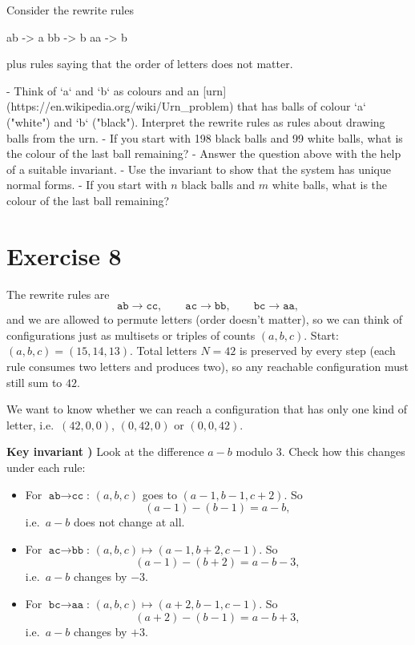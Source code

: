 \documentclass{article}
\theoremstyle{plain}
\theoremstyle{definition}
\theoremstyle{remark}
\begin{document}
Consider the rewrite rules

        ab -> a
        bb -> b
        aa -> b
        
plus rules saying that the order of letters does not matter. 

- Think of `a` and `b` as colours and an [urn](https://en.wikipedia.org/wiki/Urn_problem) that has balls of colour `a` ("white") and `b` ("black"). Interpret the rewrite rules as rules about drawing balls from the urn.
- If you start with 198 black balls and 99 white balls, what is the colour of the last ball remaining? 
- Answer the question above with the help of a suitable invariant.
- Use the invariant to show that the system has unique normal forms.
- If you start with $n$ black balls and $m$ white balls, what is the colour of the last ball remaining?

\section{Exercise 8}

The rewrite rules are
\[
\texttt{ab}\to\texttt{cc},\qquad
\texttt{ac}\to\texttt{bb},\qquad
\texttt{bc}\to\texttt{aa},
\]
and we are allowed to permute letters (order doesn't matter), so we can think of configurations just as multisets or triples of counts \((a,b,c)\).  
Start: \((a,b,c)=(15,14,13)\). Total letters \(N=42\) is preserved by every step (each rule consumes two letters and produces two), so any reachable configuration must still sum to \(42\).

We want to know whether we can reach a configuration that has only one kind of letter, i.e.\ \((42,0,0)\), \((0,42,0)\) or \((0,0,42)\).

\bigskip

\textbf{Key invariant )}  
Look at the difference \(a-b\) modulo \(3\). Check how this changes under each rule:

\begin{itemize}
  \item For \(\texttt{ab}\to\texttt{cc}\): \((a,b,c)\) goes to \((a-1,b-1,c+2)\). So
  \[
  (a-1)-(b-1)=a-b,
  \]
  i.e.\ \(a-b\) does not change at all.
  \item For \(\texttt{ac}\to\texttt{bb}\): \((a,b,c)\mapsto(a-1,b+2,c-1)\). So
  \[
  (a-1)-(b+2)=a-b-3,
  \]
  i.e.\ \(a-b\) changes by \(-3\).
  \item For \(\texttt{bc}\to\texttt{aa}\): \((a,b,c)\mapsto(a+2,b-1,c-1)\). So
  \[
  (a+2)-(b-1)=a-b+3,
  \]
  i.e.\ \(a-b\) changes by \(+3\).
\end{itemize}
\end{document}
